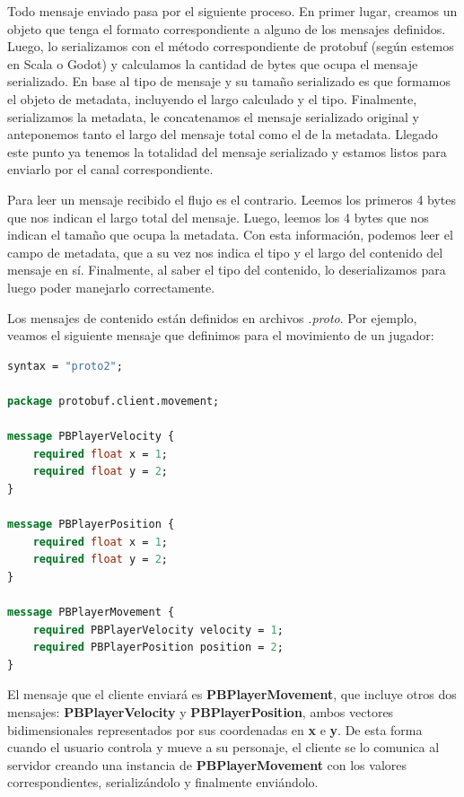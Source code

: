 \newpage

Todo mensaje enviado pasa por el siguiente proceso. En primer lugar, creamos un objeto que tenga el formato correspondiente a alguno de los
mensajes definidos. Luego, lo serializamos con el método correspondiente de protobuf (según estemos en Scala o Godot) y
calculamos la cantidad de bytes que ocupa el mensaje serializado. En base al tipo de mensaje y su tamaño serializado es que formamos el objeto de metadata, incluyendo el largo calculado y el tipo.
Finalmente, serializamos la metadata, le concatenamos el mensaje serializado original y anteponemos tanto el largo del mensaje total como el de la metadata.
Llegado este punto ya tenemos la totalidad del mensaje serializado y estamos listos para enviarlo por el canal correspondiente.

Para leer un mensaje recibido el flujo es el contrario. Leemos los primeros 4 bytes que nos indican el largo
total del mensaje. Luego, leemos los 4 bytes que nos indican el tamaño que ocupa la metadata. Con esta información, podemos leer
el campo de metadata, que a su vez nos indica el tipo y el largo del contenido del mensaje en sí. Finalmente, al saber el tipo del contenido, lo
deserializamos para luego poder manejarlo correctamente.

Los mensajes de contenido están definidos en archivos \textit{.proto}. Por ejemplo, veamos el siguiente
mensaje que definimos para el movimiento de un jugador:

\begin{lstlisting}[language=protobuf]
syntax = "proto2";

package protobuf.client.movement;

message PBPlayerVelocity {
    required float x = 1;
    required float y = 2;
}

message PBPlayerPosition {
    required float x = 1;
    required float y = 2;
}

message PBPlayerMovement {
    required PBPlayerVelocity velocity = 1;
    required PBPlayerPosition position = 2;
}
\end{lstlisting}

El mensaje que el cliente enviará es \textbf{PBPlayerMovement}, que incluye otros dos mensajes:
\textbf{PBPlayerVelocity} y \textbf{PBPlayerPosition}, ambos vectores bidimensionales representados
por sus coordenadas en \textbf{x} e \textbf{y}. De esta forma cuando el usuario controla y mueve a
su personaje, el cliente se lo comunica al servidor creando una instancia de \textbf{PBPlayerMovement}
con los valores correspondientes, serializándolo y finalmente enviándolo.


